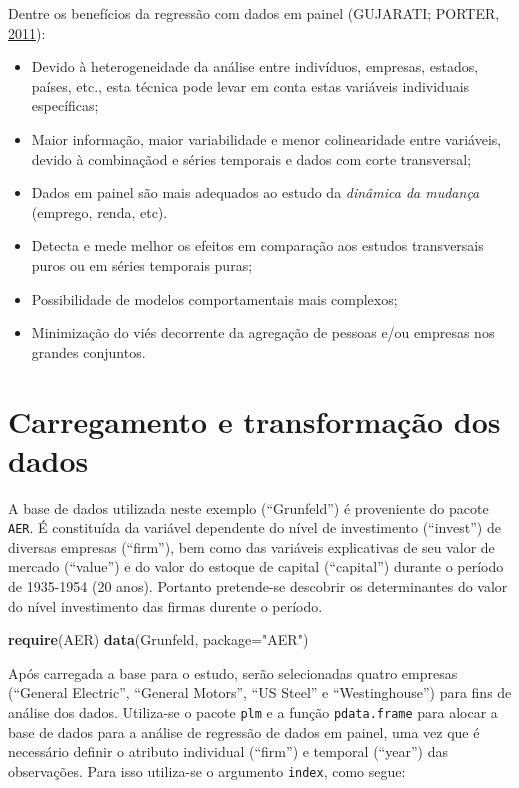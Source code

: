 \documentclass[12pt,brazil,oneside]{book}
\newenvironment{Shaded}{\begin{snugshade}}{\end{snugshade}}
\newcommand{\DataTypeTok}[1]{\textcolor[rgb]{0.13,0.29,0.53}{#1}}
\newcommand{\KeywordTok}[1]{\textcolor[rgb]{0.13,0.29,0.53}{\textbf{#1}}}
\newcommand{\NormalTok}[1]{#1}
\newcommand{\StringTok}[1]{\textcolor[rgb]{0.31,0.60,0.02}{#1}}
\begin{document}
Dentre os benefícios da regressão com dados em painel (GUJARATI; PORTER, \protect\hyperlink{ref-Gujarati2011}{2011}):

\begin{itemize}
\item
  Devido à heterogeneidade da análise entre indivíduos, empresas, estados, países, etc., esta técnica pode levar em conta estas variáveis individuais específicas;
\item
  Maior informação, maior variabilidade e menor colinearidade entre variáveis, devido à combinaçãod e séries temporais e dados com corte transversal;
\item
  Dados em painel são mais adequados ao estudo da \emph{dinâmica da mudança} (emprego, renda, etc).
\item
  Detecta e mede melhor os efeitos em comparação aos estudos transversais puros ou em séries temporais puras;
\item
  Possibilidade de modelos comportamentais mais complexos;
\item
  Minimização do viés decorrente da agregação de pessoas e/ou empresas nos grandes conjuntos.
\end{itemize}

\hypertarget{carregamento-e-transformacao-dos-dados}{%
\section{Carregamento e transformação dos dados}\label{carregamento-e-transformacao-dos-dados}}

A base de dados utilizada neste exemplo (``Grunfeld'') é proveniente do pacote \texttt{AER}. É constituída da variável dependente do nível de investimento (``invest'') de diversas empresas (``firm''), bem como das variáveis explicativas de seu valor de mercado (``value'') e do valor do estoque de capital (``capital'') durante o período de 1935-1954 (20 anos). Portanto pretende-se descobrir os determinantes do valor do nível investimento das firmas durente o período.

\begin{Shaded}
\begin{Highlighting}[]
\KeywordTok{require}\NormalTok{(AER) }
\KeywordTok{data}\NormalTok{(Grunfeld, }\DataTypeTok{package=}\StringTok{"AER"}\NormalTok{)}
\end{Highlighting}
\end{Shaded}

Após carregada a base para o estudo, serão selecionadas quatro empresas (``General Electric'', ``General Motors'', ``US Steel'' e ``Westinghouse'') para fins de análise dos dados. Utiliza-se o pacote \texttt{plm} e a função \texttt{pdata.frame} para alocar a base de dados para a análise de regressão de dados em painel, uma vez que é necessário definir o atributo individual (``firm'') e temporal (``year'') das observações. Para isso utiliza-se o argumento \texttt{index}, como segue:
\end{document}
